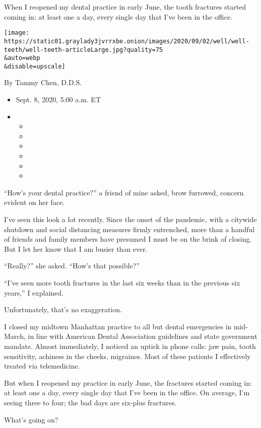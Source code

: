 When I reopened my dental practice in early June, the tooth fractures
started coming in: at least one a day, every single day that I've been
in the office.

\texttt{[image: https://static01.graylady3jvrrxbe.onion/images/2020/09/02/well/well-teeth/well-teeth-articleLarge.jpg?quality=75\\\&auto=webp\\\&disable=upscale]}

By Tammy Chen, D.D.S.

\begin{itemize}
\item
  Sept. 8, 2020, 5:00 a.m. ET
\item
  \begin{itemize}
  \item
  \item
  \item
  \item
  \item
  \item
  \end{itemize}
\end{itemize}

``How's your dental practice?'' a friend of mine asked, brow furrowed,
concern evident on her face.

I've seen this look a lot recently. Since the onset of the pandemic,
with a citywide shutdown and social distancing measures firmly
entrenched, more than a handful of friends and family members have
presumed I must be on the brink of closing. But I let her know that I am
busier than ever.

``Really?'' she asked. ``How's that possible?''

``I've seen more tooth fractures in the last six weeks than in the
previous six years,'' I explained.

Unfortunately, that's no exaggeration.

I closed my midtown Manhattan practice to all but dental emergencies in
mid-March, in line with American Dental Association guidelines and state
government mandate. Almost immediately, I noticed an uptick in phone
calls: jaw pain, tooth sensitivity, achiness in the cheeks, migraines.
Most of these patients I effectively treated via telemedicine.

But when I reopened my practice in early June, the fractures started
coming in: at least one a day, every single day that I've been in the
office. On average, I'm seeing three to four; the bad days are six-plus
fractures.

What's going on?

